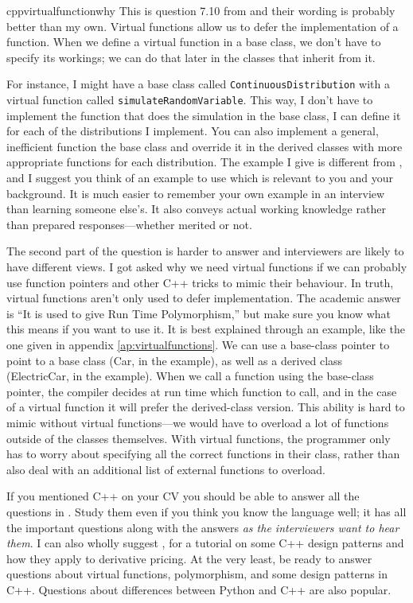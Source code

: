 \begin{answer}{cppvirtualfunctionwhy}
This is question 7.10 from \citet{JoshiQA}
and their wording is probably better than my own.
Virtual functions allow us to defer the implementation of a function.
When we define a virtual function in a base class, we don't have to specify its workings; we can do that later in the classes that inherit from it.

For instance, I might have a base class called \verb+ContinuousDistribution+ with a virtual function  called \verb+simulateRandomVariable+.
This way, I don't have to implement the function that does the simulation in the base class, I can define it for each of the distributions I implement.
You can also implement a general, inefficient function the base class and override it in the derived classes with more appropriate functions for each distribution.
The example I give is different from
\citet[question 7.10]{JoshiQA},
and I suggest you think of an example to use which is relevant to you and your background.
It is much easier to remember your own example in an interview than learning someone else's.
It also conveys actual working knowledge rather than prepared responses---whether merited or not.


The second part of the question is harder to answer and interviewers are likely to have different views.
I got asked why we need virtual functions if we can probably use function pointers and other C++ tricks to mimic their behaviour.
In truth, virtual functions aren't only used to defer implementation.
The academic answer is ``It is used to give Run Time Polymorphism,'' but  make sure you know what this means if you want to use it.
It is best explained through an example, like the one given in appendix \ref{ap:virtualfunctions}.
We can use a base-class pointer to point to a base class (Car, in the example), as well as a derived class (ElectricCar, in the example).
When we call a function using the base-class pointer, the compiler decides at run time which function to call, and in the case of a virtual function it will prefer the derived-class version.
This ability is hard to mimic without virtual functions---we would have to overload a lot of  functions outside of the classes themselves.
With virtual functions, the programmer only has to worry about specifying all the correct functions in their class, rather than also deal with an additional list of external functions to overload.

If you mentioned C++ on your CV you should be able to answer all the questions in
\citet[chap.~7]{JoshiQA}.
Study them even if you think you know the language well; it has all the important questions along with the answers \emph{as the interviewers want to hear them}.
I can also wholly suggest \citet{joshi2008cpp}, for a tutorial on some C++ design patterns and how they apply to derivative pricing.
At the very least, be ready to answer questions about virtual functions, polymorphism, and some design patterns in C++.
Questions about differences between Python and C++ are also popular.
\end{answer}
